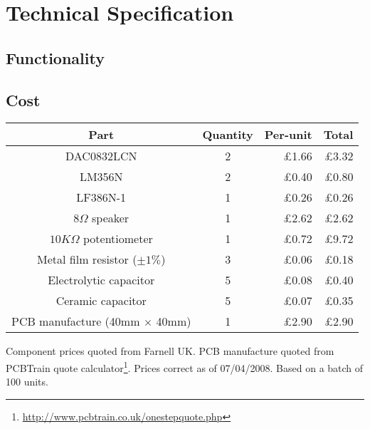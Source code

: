 \chapter{Technical Specification}

\section{Functionality}
\label{sec:spec:functionality}

\section{Cost}
\label{sec:spec:cost}

\begin{center}
\begin{tabular}{c | c | r | r}
Part & Quantity & Per-unit & Total \\
\hline\hline
DAC0832LCN              & 2     & \pounds1.66 & \pounds3.32 \\
LM356N                  & 2     & \pounds0.40 & \pounds0.80 \\
LF386N-1                & 1     & \pounds0.26 & \pounds0.26 \\
$8\Omega$ speaker       & 1     & \pounds2.62 & \pounds2.62 \\
$10K\Omega$ potentiometer & 1     & \pounds0.72 & \pounds9.72 \\
Metal film resistor ($\pm1\%$)    & 3     & \pounds0.06 & \pounds0.18 \\
Electrolytic capacitor  & 5     & \pounds0.08 & \pounds0.40 \\
Ceramic capacitor       & 5     & \pounds0.07 & \pounds0.35 \\
PCB manufacture (40mm $\times$ 40mm) & 1     & \pounds2.90 & \pounds2.90 \\
\end{tabular}
\end{center}

Component prices quoted from Farnell UK.  PCB manufacture quoted from PCBTrain quote 
calculator\footnote{\url{http://www.pcbtrain.co.uk/onestepquote.php}}.  Prices correct as of 
07/04/2008.  Based on a batch of 100 units.
